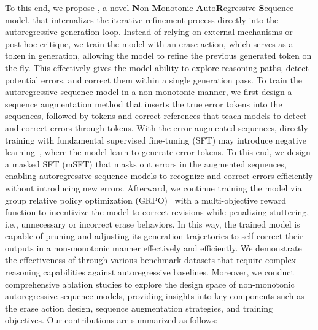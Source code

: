 To this end, we propose \modelname, a novel \textbf{N}on-\textbf{M}onotonic \textbf{A}uto\textbf{R}egressive \textbf{S}equence model, that internalizes the iterative refinement process directly into the autoregressive generation loop. 
Instead of relying on external mechanisms or post-hoc critique, we train the model with an erase action, which serves as a token \bk in generation, allowing the model to refine the previous generated token on the fly. 
This effectively gives the model ability to explore reasoning paths, detect potential errors, and correct them within a single generation pass.
To train the autoregressive sequence model in a non-monotonic manner, we first design a sequence augmentation method that inserts the true error tokens into the sequences, followed by \bk tokens and correct references that teach models to detect and correct errors through \bk tokens. 
With the error augmented sequences, directly training with fundamental supervised fine-tuning (SFT) may introduce negative learning~\cite{kumar2024training}, where the model learn to generate error tokens.
To this end, we design a masked SFT (mSFT) that masks out errors in the augmented sequences, enabling autoregressive sequence models to recognize and correct errors efficiently without introducing new errors.
Afterward, we continue training the model via group relative policy optimization (GRPO)~\cite{shao2024deepseekmath} with a multi-objective reward function to incentivize the model to correct revisions while penalizing stuttering, i.e., unnecessary or incorrect erase behaviors.
In this way, the trained model is capable of pruning and adjusting its generation trajectories to self-correct their outputs in a non-monotonic manner effectively and efficiently. 
We demonstrate the effectiveness of \modelname through various benchmark datasets that require complex reasoning capabilities against autoregressive baselines.
Moreover, we conduct comprehensive ablation studies to explore the design space of non-monotonic autoregressive sequence models, providing insights into key components such as the erase action design, sequence augmentation strategies, and training objectives.
Our contributions are summarized as follows: 
